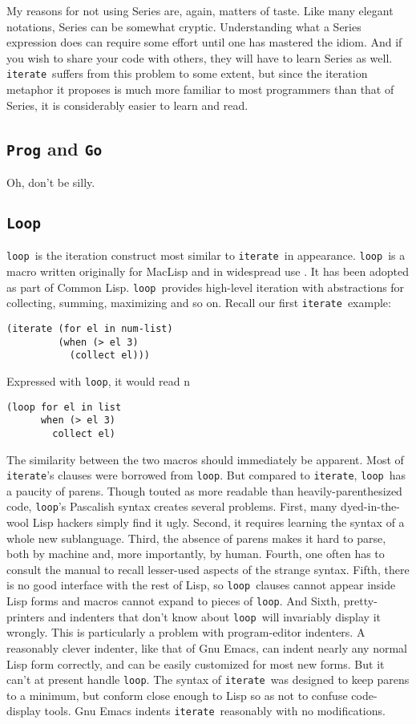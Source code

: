 \documentclass[12pt]{article}
\newcommand{\lisp}{\tt}
\newcommand{\iter}{{\lisp iterate}}
\newcommand{\looP}{{\lisp loop}}
\newcommand{\LooP}{{\lisp Loop}}
\begin{document}
My reasons for not using Series are, again, matters of taste.  Like many
elegant notations, Series can be somewhat cryptic.  Understanding what a
Series expression does can require some effort until one has mastered
the idiom.  And if you wish to share your code with others, they will
have to learn Series as well.  \iter\ suffers from this problem to some
extent, but since the iteration metaphor it proposes is much more
familiar to most programmers than that of Series, it is considerably
easier to learn and read.

\subsection{{\lisp Prog} and {\lisp Go}}

Oh, don't be silly.


\subsection{\LooP}

\looP\ is the iteration construct most similar to \iter\ in
appearance.  \looP\ is a macro written originally for MacLisp and in
widespread use \cite{Loop}.  It has been adopted as part of Common
Lisp.  \looP\ provides high-level iteration with abstractions for
collecting, summing, maximizing and so on.  Recall our first \iter\
example:

\pagebreak[2]
\begin{verbatim}
(iterate (for el in num-list)
         (when (> el 3)
           (collect el)))
\end{verbatim}

\pagebreak[2]
Expressed with \looP, it would read
n
\begin{verbatim}
(loop for el in list
      when (> el 3)
        collect el)
\end{verbatim}

The similarity between the two macros should immediately be apparent.
Most of \iter's clauses were borrowed from \looP.  But compared to
\iter, \looP\ has a paucity of parens.  Though touted as more readable
than heavily-parenthesized code, \looP's Pascalish syntax creates
several problems.  First, many dyed-in-the-wool Lisp hackers simply
find it ugly.  Second, it requires learning the syntax of a whole new
sublanguage.  Third, the absence of parens makes it hard to parse,
both by machine and, more importantly, by human.  Fourth, one often
has to consult the manual to recall lesser-used aspects of the strange
syntax.  Fifth, there is no good interface with the rest of Lisp, so
\looP\ clauses cannot appear inside Lisp forms and macros cannot
expand to pieces of \looP.  And Sixth, pretty-printers and indenters
that don't know about \looP\ will invariably display it wrongly.  This
is particularly a problem with program-editor indenters.  A reasonably
clever indenter, like that of Gnu Emacs, can indent nearly any normal
Lisp form correctly, and can be easily customized for most new forms.
But it can't at present handle \looP.  The syntax of \iter\ was
designed to keep parens to a minimum, but conform close enough to Lisp
so as not to confuse code-display tools.  Gnu Emacs indents \iter\
reasonably with no modifications.
\end{document}
